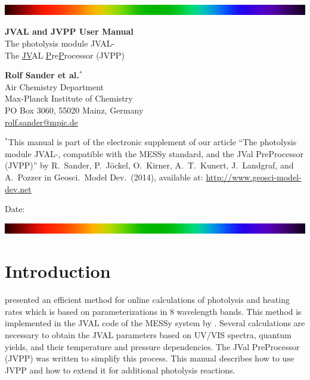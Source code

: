 \documentclass[a4paper,twoside]{article}
\begin{document}
\thispagestyle{empty}

\begin{center}

  \centering\includegraphics[width=\textwidth]{spectrum}

  \vfill

  {\Huge\bf JVAL and JVPP User Manual}\\[3mm]

  {\Large The photolysis module JVAL-\jvalversion\\[2mm]
  The \underline{JV}AL \underline{P}re\underline{P}rocessor (JVPP)}

  \vfill

  {\LARGE\bf Rolf Sander et al.$^*$}\\[2mm]
  {\large Air Chemistry Department\\
  Max-Planck Institute of Chemistry\\
  PO Box 3060, 55020 Mainz, Germany\\
  \url{rolf.sander@mpic.de}}

  \vfill

  \tableofcontents

  \vfill

  {\large $^*$This manual is part of the electronic supplement of our
    article ``The photolysis module JVAL-\jvalversion, compatible with
    the MESSy standard, and the JVal PreProcessor (JVPP)'' by R.~Sander,
    P.~J\"ockel, O.~Kirner, A.~T.~Kunert, J.~Landgraf, and A.~Pozzer in
    Geosci.\ Model Dev.\ (2014), available at:
    \url{http://www.geosci-model-dev.net}}

  \vfill

  {\Large Date: \myfiledate}

  \vfill

  \centering\includegraphics[width=\textwidth]{spectrum}

\end{center}

\twocolumn

\section{Introduction}

\citet{906} presented an efficient method for online calculations of
photolysis and heating rates which is based on parameterizations in 8
wavelength bands. This method is implemented in the JVAL code of the
MESSy system by \citet{2400}. Several calculations are necessary to
obtain the JVAL parameters based on UV/VIS spectra, quantum yields, and
their temperature and pressure dependencies. The JVal PreProcessor
(JVPP) was written to simplify this process. This manual describes how
to use JVPP and how to extend it for additional photolysis reactions.
\end{document}
